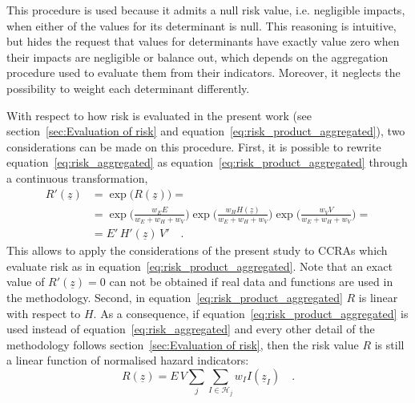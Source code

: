 This procedure is used because it admits a null \gls{risk} value, i.e. negligible \glspl{impact}, when either of the values for its \gls{determinant} is null. This reasoning is intuitive, but hides the request that values for \glspl{determinant} have exactly value zero when their \glspl{impact} are negligible or balance out, which depends on the aggregation procedure used to evaluate them from their \glspl{indicator}. Moreover, it neglects the possibility to weight each \gls{determinant} differently.

With respect to how \gls{risk} is evaluated in the present work (see section~\ref{sec:Evaluation of risk} and equation~\eqref{eq:risk_product_aggregated}), two considerations can be made on this procedure.
First, it is possible to rewrite equation~\eqref{eq:risk_aggregated} as equation~\eqref{eq:risk_product_aggregated} through a continuous transformation,
\begin{equation}
  \label{eq:risk_equivalence}
  \begin{split}
    R'(\underline{z}) & = \exp{\big( R(\underline{z}) \big)} = \\
    & = \exp{\bigg( \frac{w_E E}{w_E + w_H + w_V} \bigg)} \exp{\bigg( \frac{w_H H(\underline{z})}{w_E + w_H + w_V} \bigg)} \exp{\bigg( \frac{w_V V}{w_E + w_H + w_V} \bigg)} = \\
    & = E' \, H'(\underline{z}) \, V'
    \quad .
  \end{split}
\end{equation}
This allows to apply the considerations of the present study to \glspl{CCRA} which evaluate \gls{risk} as in equation~\eqref{eq:risk_product_aggregated}. Note that an exact value of $R'(\underline{z}) = 0$ can not be obtained if real data and functions are used in the methodology.
Second, in equation~\eqref{eq:risk_product_aggregated} $R$ is linear with respect to $H$. As a consequence, if equation~\eqref{eq:risk_product_aggregated} is used instead of equation~\eqref{eq:risk_aggregated} and every other detail of the methodology follows section~\ref{sec:Evaluation of risk}, then the \gls{risk} value $R$ is still a linear function of normalised \gls{hazard} \glspl{indicator}:
\begin{equation}
  \label{eq:risk_product_linearity}
  R(\underline{z}) = E \, V \sum_j \sum_{I \in \mathcal{H}_j} w_I I(\underline{z}_I)
  \quad .
\end{equation}
